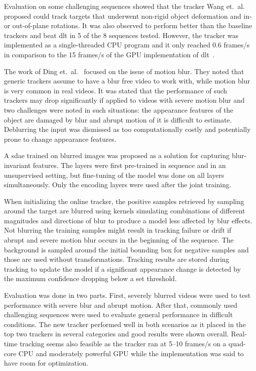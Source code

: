 Evaluation on some challenging sequences showed that the tracker Wang et.~al.~\cite{LEARNED_HIERARCH}
proposed could track targets that underwent non-rigid object deformation and in- or
out-of-plane rotations. It was also observed to perform better than the baseline trackers
and beat \ac{dlt} in 5 of the 8 sequences tested. However, the tracker was implemented
as a single-threaded CPU program and it only reached 0.6 frames/s in comparison to the 15
frames/s of the GPU implementation of \ac{dlt}~\cite{DLT}.

The work of Ding et.~al.~\cite{BLUR_TRACK} focused on the issue of motion blur. They noted
that generic trackers assume to have a blur free video to work with, while motion blur is
very common in real videos. It was stated that the performance of such trackers may drop
significantly if applied to videos with severe motion blur and two challenges were
noted in such situations: the appearance features of the object are damaged by blur
and abrupt motion of it is difficult to estimate. Deblurring the input was dismissed as
too computationally costly and potentially prone to change appearance features.~\cite{BLUR_TRACK}

A \ac{sdae} trained on blurred images was proposed as a solution for capturing blur-invariant
features. The layers were first pre-trained in sequence and in an unsupervised setting,
but fine-tuning of the model was done on all layers simultaneously. Only the encoding
layers were used after the joint training.~\cite{BLUR_TRACK}

When initializing the online tracker, the positive samples retrieved by sampling around
the target are blurred using kernels simulating combinations of different magnitudes
and directions of blur to produce a model less affected by blur effects. Not blurring
the training samples might result in tracking failure or drift if abrupt and severe
motion blur occurs in the beginning of the sequence. The background is sampled around
the initial bounding box for negative samples and those are used without transformations.
Tracking results are stored during tracking to update the model if a significant
appearance change is detected by the maximum confidence dropping below a set threshold.~\cite{BLUR_TRACK}

Evaluation was done in two parts. First, severely blurred videos were used to test
performance with severe blur and abrupt motion. After that, commonly used challenging
sequences were used to evaluate general performance in difficult conditions. The new
tracker performed well in both scenarios as it placed in the top two trackers in several
categories and good results were shown overall. Real-time tracking seems also feasible
as the tracker ran at 5--10 frames/s on a quad-core CPU and moderately powerful GPU while
the implementation was said to have room for optimization.~\cite{BLUR_TRACK}


